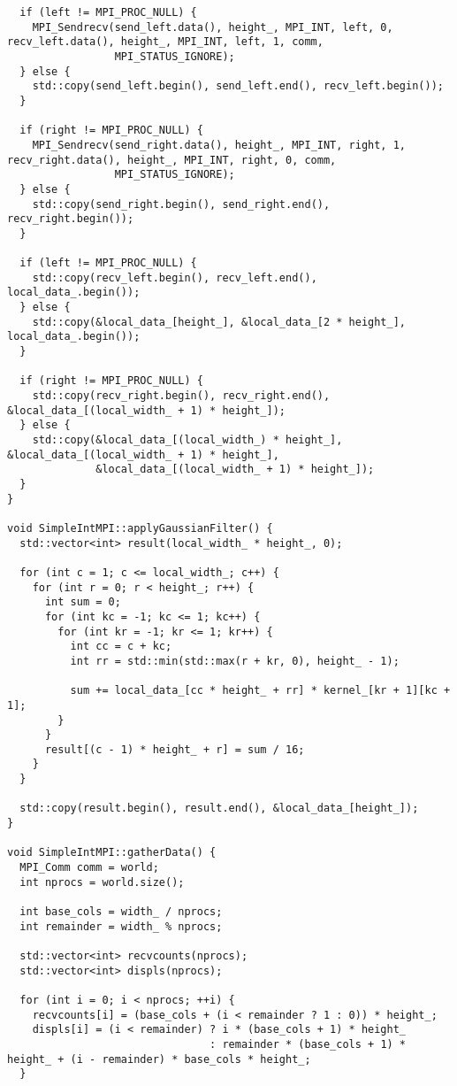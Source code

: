 \documentclass[12pt]{article}
\begin{document}
\begin{lstlisting}
  if (left != MPI_PROC_NULL) {
    MPI_Sendrecv(send_left.data(), height_, MPI_INT, left, 0, recv_left.data(), height_, MPI_INT, left, 1, comm,
                 MPI_STATUS_IGNORE);
  } else {
    std::copy(send_left.begin(), send_left.end(), recv_left.begin());
  }

  if (right != MPI_PROC_NULL) {
    MPI_Sendrecv(send_right.data(), height_, MPI_INT, right, 1, recv_right.data(), height_, MPI_INT, right, 0, comm,
                 MPI_STATUS_IGNORE);
  } else {
    std::copy(send_right.begin(), send_right.end(), recv_right.begin());
  }

  if (left != MPI_PROC_NULL) {
    std::copy(recv_left.begin(), recv_left.end(), local_data_.begin());
  } else {
    std::copy(&local_data_[height_], &local_data_[2 * height_], local_data_.begin());
  }

  if (right != MPI_PROC_NULL) {
    std::copy(recv_right.begin(), recv_right.end(), &local_data_[(local_width_ + 1) * height_]);
  } else {
    std::copy(&local_data_[(local_width_) * height_], &local_data_[(local_width_ + 1) * height_],
              &local_data_[(local_width_ + 1) * height_]);
  }
}

void SimpleIntMPI::applyGaussianFilter() {
  std::vector<int> result(local_width_ * height_, 0);

  for (int c = 1; c <= local_width_; c++) {
    for (int r = 0; r < height_; r++) {
      int sum = 0;
      for (int kc = -1; kc <= 1; kc++) {
        for (int kr = -1; kr <= 1; kr++) {
          int cc = c + kc;
          int rr = std::min(std::max(r + kr, 0), height_ - 1);

          sum += local_data_[cc * height_ + rr] * kernel_[kr + 1][kc + 1];
        }
      }
      result[(c - 1) * height_ + r] = sum / 16;
    }
  }

  std::copy(result.begin(), result.end(), &local_data_[height_]);
}

void SimpleIntMPI::gatherData() {
  MPI_Comm comm = world;
  int nprocs = world.size();

  int base_cols = width_ / nprocs;
  int remainder = width_ % nprocs;

  std::vector<int> recvcounts(nprocs);
  std::vector<int> displs(nprocs);

  for (int i = 0; i < nprocs; ++i) {
    recvcounts[i] = (base_cols + (i < remainder ? 1 : 0)) * height_;
    displs[i] = (i < remainder) ? i * (base_cols + 1) * height_
                                : remainder * (base_cols + 1) * height_ + (i - remainder) * base_cols * height_;
  }


\end{lstlisting}
\end{document}
